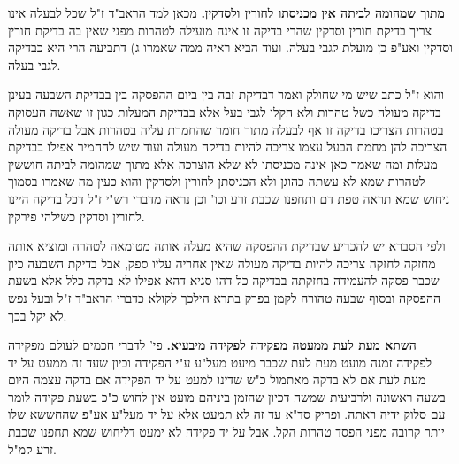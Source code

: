 \documentclass[12pt, openany]{book}
\newcommand{\sethebfont}{
\fontsize{10.5pt}{21.0pt} \selectfont
}
\newcommand{\twocol}[1]{
	{\sethebfont \begin{multicols}{2}
			#1
	\end{multicols}}	
}
\begin{document}
\twocol{\textbf{מתוך שמהומה לביתה אין מכניסתו לחורין ולסדקין.}  מכאן למד הראב"ד ז"ל שכל לבעלה אינו צריך בדיקת חורין וסדקין שהרי בדיקה זו אינה מועילה לטהרות מפני שאין בה בדיקת חורין וסדקין ואע"פ כן מועלת לגבי בעלה. ועוד הביא ראיה ממה שאמרו ג) דתביעה הרי היא כבדיקה לגבי בעלה.\par  והוא ז"ל כתב שיש מי שחולק ואמר דבדיקת זבה בין ביום ההפסקה בין בבדיקת השבעה בעינן בדיקה מעולה כשל טהרות ולא הקלו לגבי בעל אלא בבדיקת המעלות כגון זו שאשה העסוקה בטהרות הצריכו בדיקה זו אף לבעלה מתוך חומר שהחמרת עליה בטהרות אבל בדיקה מעולה הצריכה להן מחמת הבעל עצמו צריכה להיות בדיקה מעולה ועוד שיש להחמיר אפילו בבדיקת מעלות ומה שאמר כאן אינה מכניסתו לא שלא הוצרכה אלא מתוך שמהומה לביתה חוששין לטהרות שמא לא עשתה כהוגן ולא הכניסתן לחורין ולסדקין והוא כעין מה שאמרו בסמוך ניחוש שמא תראה טפת דם ותחפנו שכבת זרע וכו' וכן נראה מדברי רש"י ז"ל דכל בדיקה היינו לחורין וסדקין כשילהי פירקין.\par ולפי הסברא יש להכריע שבדיקת ההפסקה שהיא מעלה אותה מטומאה לטהרה ומוציא אותה מחזקה לחזקה צריכה להיות בדיקה מעולה שאין אחריה עליו ספק, אבל בדיקת השבעה כיון שכבר פסקה להעמידה בחזקתה בבדיקה כל דהו סגיא דהא אפילו לא בדקה כלל אלא בשעת ההפסקה ובסוף שבעה טהורה לקמן בפרק בתרא הילכך לקולא כדברי הראב"ד ז"ל ובעל נפש לא יקל בכך. 
\par\textbf{השתא מעת לעת ממעטה מפקידה לפקידה מיבעיא.}  פי' לדברי חכמים לעולם מפקידה לפקידה זמנה מועט מעת לעת שכבר מיעט מעל"ע ע"י הפקידה וכיון שעד זה ממעט על יד מעת לעת אם לא בדקה מאתמול כ"ש שדינו למעט על יד הפקידה אם בדקה עצמה היום בשעה ראשונה ולרביעית שמשה דכיון שהזמן ביניהם מועט אין לחוש כ"כ בשעת פקידה לומר עם סלוק ידיה ראתה. ופריק סד"א עד זה לא תמעט אלא על יד מעל"ע אע"פ שהחששא שלו יותר קרובה מפני הפסד טהרות הקל. אבל על יד פקידה לא ימעט דליחוש שמא תחפנו שכבת זרע קמ"ל. 
\par}
\end{document}
